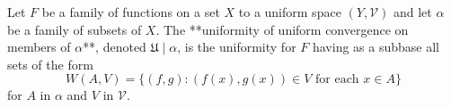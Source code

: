 Let $F$ be a family of functions on a set $X$ to a uniform space $(Y, \mathcal{V})$ and let $\alpha$ be a family of subsets of $X$. The **uniformity of uniform convergence on members of $\alpha$**, denoted $\mathfrak{U} \mid \alpha$, is the uniformity for $F$ having as a subbase all sets of the form
$$W(A, V) = \{(f, g) : (f(x), g(x)) \in V \text{ for each } x \in A\}$$
for $A$ in $\alpha$ and $V$ in $\mathcal{V}$.

